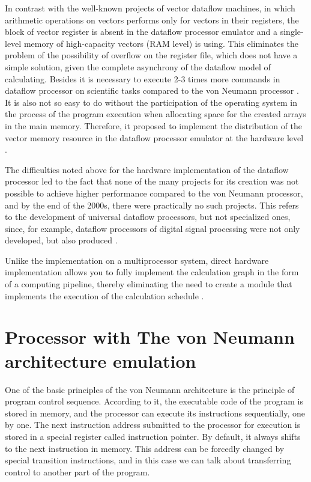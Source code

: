 \documentclass[
11pt,%
tightenlines,%
twoside,%
onecolumn,%
nofloats,%
nobibnotes,%
nofootinbib,%
superscriptaddress,%
noshowpacs,%
centertags]%
{revtex4}
\begin{document}
In contrast with the well-known projects of vector dataflow machines, in which arithmetic operations on vectors performs only for vectors in their registers, the block of vector register is absent in the dataflow processor emulator and a single-level memory of high-capacity vectors (RAM level) is using.
This eliminates the problem of the possibility of overflow on the register file, which does not have a simple solution, given the complete asynchrony of the dataflow model of calculating.
Besides it is necessary to execute 2-3 times more commands in dataflow processor on scientific tasks compared to the von Neumann processor \cite{multithreading}.
It is also not so easy to do without the participation of the operating system in the process of the program execution when allocating space for the created arrays in the main memory.
Therefore, it proposed to implement the distribution of the vector memory resource in the dataflow processor emulator at the hardware level \cite{vpp}.

The difficulties noted above for the hardware implementation of the dataflow processor led to the fact that none of the many projects for its creation was not possible to achieve higher performance compared to the von Neumann processor, and by the end of the 2000s, there were practically no such projects.
This refers to the development of universal dataflow processors, but not specialized ones, since, for example, dataflow processors of digital signal processing were not only developed, but also produced \cite{terada}.

Unlike the implementation on a multiprocessor system, direct hardware implementation allows you to fully implement the calculation graph in the form of a computing pipeline, thereby eliminating the need to create a module that implements the execution of the calculation schedule \cite{popov}.

\section{Processor with The von Neumann architecture emulation}

One of the basic principles of the von Neumann architecture is the principle of program control sequence.
According to it, the executable code of the program is stored in memory, and the processor can execute its instructions sequentially, one by one.
The next instruction address submitted to the processor for execution is stored in a special register called instruction pointer.
By default, it always shifts to the next instruction in memory.
This address can be forcedly changed by special transition instructions, and in this case we can talk about transferring control to another part of the program.
\end{document}
